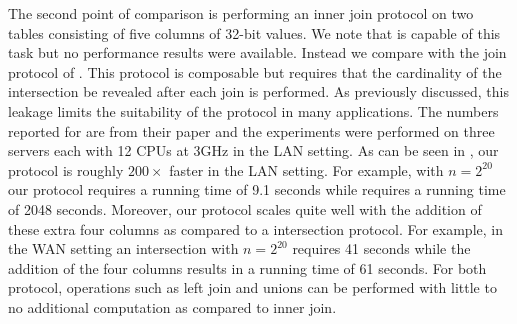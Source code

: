 The second point of comparison is performing an inner join protocol on two tables consisting of five columns of 32-bit values. We note that \cite{ASIACCS:BlaAgu12} is capable of this task but no performance results were available. Instead we compare with the join protocol of \cite{LTW13}. This protocol is composable but requires that the cardinality of the intersection be revealed after each join is performed. As previously discussed, this leakage limits the suitability of the protocol in many applications. The numbers reported for \cite{LTW13} are from their paper and the experiments were performed on three servers each with 12 CPUs at 3GHz in the LAN setting. As can be seen in , our protocol is roughly $200\times$ faster in the LAN setting. For example, with $n=2^{20}$ our protocol requires a running time of 9.1 seconds while \cite{LTW13} requires a running time of 2048 seconds. Moreover, our protocol scales quite well with the addition of these extra four columns as compared to a intersection protocol. For example, in the WAN setting an intersection with $n=2^{20}$ requires 41 seconds while the addition of the four columns results in a  running time of 61 seconds. For both protocol, operations such as left join and unions can be performed with little to no additional computation as compared to inner join.

